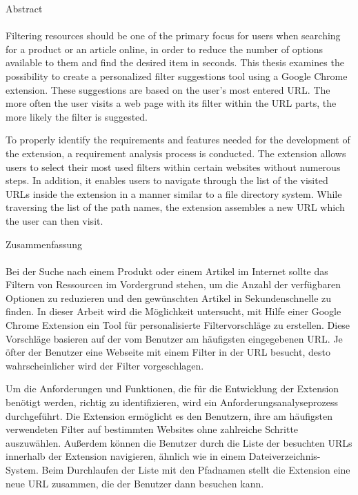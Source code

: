 \newpage
\thispagestyle{empty}
\vspace*{2.2cm}
\noindent %
{\Huge Abstract}\\
\vspace*{1.6cm} \\

\pagestyle{headings}
Filtering resources should be one of the primary focus for users when searching for a product or an article online, in order to reduce the number of options available to them and find the desired item in seconds. This thesis examines the possibility to create a personalized filter suggestions tool using a Google Chrome extension. These suggestions are based on the user's most entered URL. The more often the user visits a web page with its filter within the URL parts, the more likely the filter is suggested.

To properly identify the requirements and features needed for the development of the extension, a requirement analysis process is conducted. The extension allows users to select their most used filters within certain websites without numerous steps. In addition, it enables users to navigate through the list of the visited URLs inside the extension in a manner similar to a file directory system. While traversing the list of the path names, the extension assembles a new URL which the user can then visit.

\newpage
\thispagestyle{empty}
\vspace*{2.2cm}
\noindent %
{\Huge Zusammenfassung}\\
\vspace*{1.6cm} \\

\pagestyle{headings}
Bei der Suche nach einem Produkt oder einem Artikel im Internet sollte das Filtern von Ressourcen im Vordergrund stehen, um die Anzahl der verf\"ugbaren Optionen zu reduzieren und den gew\"unschten Artikel in Sekundenschnelle zu finden. In dieser Arbeit wird die M\"oglichkeit untersucht, mit Hilfe einer Google Chrome Extension ein Tool f\"ur personalisierte Filtervorschl\"age zu erstellen. Diese Vorschl\"age basieren auf der vom Benutzer am h\"aufigsten eingegebenen URL. Je \"ofter der Benutzer eine Webseite mit einem Filter in der URL besucht, desto wahrscheinlicher wird der Filter vorgeschlagen.

Um die Anforderungen und Funktionen, die f\"ur die Entwicklung der Extension ben\"otigt werden, richtig zu identifizieren, wird ein Anforderungsanalyseprozess durchgef\"uhrt. Die Extension erm\"oglicht es den Benutzern, ihre am h\"aufigsten verwendeten Filter auf bestimmten Websites ohne zahlreiche Schritte auszuw\"ahlen. Au{\ss}erdem k\"onnen die Benutzer durch die Liste der besuchten URLs innerhalb der Extension navigieren, \"ahnlich wie in einem Dateiverzeichnis-System. Beim Durchlaufen der Liste mit den Pfadnamen stellt die Extension eine neue URL zusammen, die der Benutzer dann besuchen kann.
